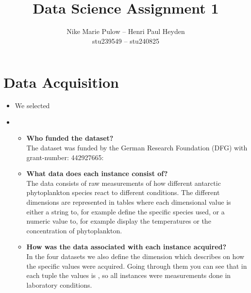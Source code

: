 
\newcommand{\nr}{1}
\title{Data Science Assignment \nr}
\author{Nike Marie Pulow -- Henri Paul Heyden \\ \small stu239549 -- stu240825}
\date{}


    \maketitle
    \section{Data Acquisition}
    \begin{itemize}
        \item[1.] We selected 
        \item[2.] \gap
            \begin{itemize}
                \item[3.1] \textbf{Who funded the dataset?} \\
                    The dataset was funded by the German Research Foundation (DFG) with grant-number: 442927665: 
                \item[3.2] \textbf{What data does each instance consist of?} \\
                    The data consists of raw measurements of how different antarctic phytoplankton species react to different conditions. The different dimensions are represented in tables where each dimensional value is either a string to, for example define the specific species used, or a numeric value to, for example display the temperatures or the concentration of phytoplankton.
                \item[3.3] \textbf{How was the data associated with each instance acquired?} \\
                    In the four datasets we also define the dimension  which describes on how the specific values were acquired. Going through them you can see that in each tuple the values is , so all instances were measurements done in laboratory conditions.

\end{itemize}
\end{itemize}
